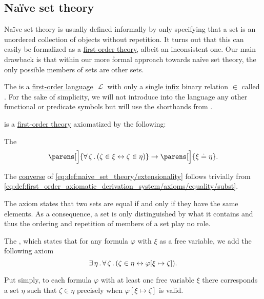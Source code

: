 \subsection{Na\"ive set theory}\label{subsec:naive_set_theory}

Na\"ive set theory is usually defined informally by only specifying that a set is an unordered collection of objects without repetition. It turns out that this can easily be formalized as a \hyperref[def:first_order_theory]{first-order theory}, albeit an inconsistent one. Our main drawback is that within our more formal approach towards na\"ive set theory, the only possible members of sets are other sets.

\begin{definition}\label{def:naive_set_theory}
  The  is a \hyperref[def:first_order_syntax]{first-order language} \( \mscrL \) with only a single \hyperref[rem:first_order_formula_conventions/infix]{infix} binary relation \( \in \) called . For the sake of simplicity, we will not introduce into the language any other functional or predicate symbols but will use the shorthands from .

   is a \hyperref[def:first_order_theory]{first-order theory} axiomatized by the following:
  \begin{thmenum}
     The 
    \begin{equation}\label{eq:def:naive_set_theory/extensionality}
      \parens[\Big]{ \qforall \zeta (\zeta \in \xi \leftrightarrow \zeta \in \eta) } \rightarrow \parens[\Big]{ \xi \doteq \eta }.
    \end{equation}

    The \hyperref[def:binary_relation/converse]{converse} of \eqref{eq:def:naive_set_theory/extensionality} follows trivially from \eqref{eq:def:first_order_axiomatic_derivation_system/axioms/equality/subst}.

    The axiom states that two sets are equal if and only if they have the same elements. As a consequence, a set is only distinguished by what it contains and thus the ordering and repetition of members of a set play no role.

     The , which states that for any formula \( \varphi \) with \( \xi \) as a free variable, we add the following axiom
    \begin{equation}\label{eq:def:naive_set_theory/unrestricted_comprehension}
      \exists \thinspace \eta \thinspace . \thinspace \forall \thinspace \zeta \thinspace . \thinspace (\zeta \in \eta \leftrightarrow \varphi[\xi \mapsto \zeta]).
    \end{equation}

    Put simply, to each formula \( \varphi \) with at least one free variable \( \xi \) there corresponds a set \( \eta \) such that \( \zeta \in \eta \) precisely when \( \varphi[\xi \mapsto \zeta] \) is valid.
  \end{thmenum}
\end{definition}

